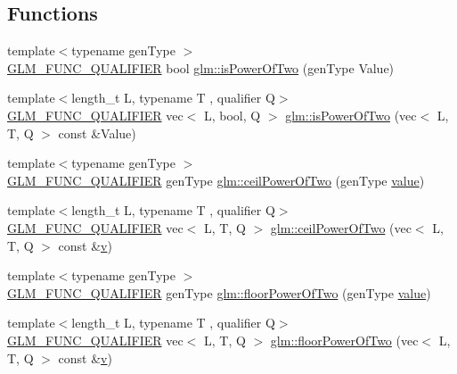 \subsection*{Functions}
\begin{DoxyCompactItemize}
\item 
{\footnotesize template$<$typename gen\+Type $>$ }\\\hyperlink{setup_8hpp_a33fdea6f91c5f834105f7415e2a64407}{G\+L\+M\+\_\+\+F\+U\+N\+C\+\_\+\+Q\+U\+A\+L\+I\+F\+I\+ER} bool \hyperlink{namespaceglm_a2e60d24d864637d3ebd62e6fa4941613}{glm\+::is\+Power\+Of\+Two} (gen\+Type Value)
\item 
{\footnotesize template$<$length\+\_\+t L, typename T , qualifier Q$>$ }\\\hyperlink{setup_8hpp_a33fdea6f91c5f834105f7415e2a64407}{G\+L\+M\+\_\+\+F\+U\+N\+C\+\_\+\+Q\+U\+A\+L\+I\+F\+I\+ER} vec$<$ L, bool, Q $>$ \hyperlink{group__gtc__round_gabf2b61ded7049bcb13e25164f832a290}{glm\+::is\+Power\+Of\+Two} (vec$<$ L, T, Q $>$ const \&Value)
\item 
{\footnotesize template$<$typename gen\+Type $>$ }\\\hyperlink{setup_8hpp_a33fdea6f91c5f834105f7415e2a64407}{G\+L\+M\+\_\+\+F\+U\+N\+C\+\_\+\+Q\+U\+A\+L\+I\+F\+I\+ER} gen\+Type \hyperlink{namespaceglm_a15ad0f1b70561471f34bc2e43469424e}{glm\+::ceil\+Power\+Of\+Two} (gen\+Type \hyperlink{_s_d_l__opengl__glext_8h_a8ad81492d410ff2ac11f754f4042150f}{value})
\item 
{\footnotesize template$<$length\+\_\+t L, typename T , qualifier Q$>$ }\\\hyperlink{setup_8hpp_a33fdea6f91c5f834105f7415e2a64407}{G\+L\+M\+\_\+\+F\+U\+N\+C\+\_\+\+Q\+U\+A\+L\+I\+F\+I\+ER} vec$<$ L, T, Q $>$ \hyperlink{group__gtc__round_gab53d4a97c0d3e297be5f693cdfdfe5d2}{glm\+::ceil\+Power\+Of\+Two} (vec$<$ L, T, Q $>$ const \&\hyperlink{_s_d_l__opengl_8h_a10a82eabcb59d2fcd74acee063775f90}{v})
\item 
{\footnotesize template$<$typename gen\+Type $>$ }\\\hyperlink{setup_8hpp_a33fdea6f91c5f834105f7415e2a64407}{G\+L\+M\+\_\+\+F\+U\+N\+C\+\_\+\+Q\+U\+A\+L\+I\+F\+I\+ER} gen\+Type \hyperlink{namespaceglm_ac1385510b859757901e927c43bf4f329}{glm\+::floor\+Power\+Of\+Two} (gen\+Type \hyperlink{_s_d_l__opengl__glext_8h_a8ad81492d410ff2ac11f754f4042150f}{value})
\item 
{\footnotesize template$<$length\+\_\+t L, typename T , qualifier Q$>$ }\\\hyperlink{setup_8hpp_a33fdea6f91c5f834105f7415e2a64407}{G\+L\+M\+\_\+\+F\+U\+N\+C\+\_\+\+Q\+U\+A\+L\+I\+F\+I\+ER} vec$<$ L, T, Q $>$ \hyperlink{group__gtc__round_gaf0d591a8fca8ddb9289cdeb44b989c2d}{glm\+::floor\+Power\+Of\+Two} (vec$<$ L, T, Q $>$ const \&\hyperlink{_s_d_l__opengl_8h_a10a82eabcb59d2fcd74acee063775f90}{v})

\end{DoxyCompactItemize}
